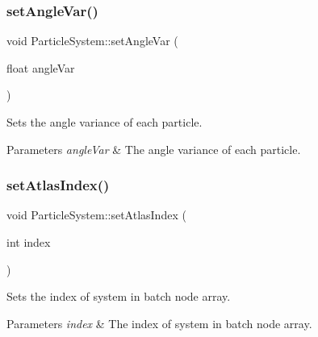 \subsubsection{\texorpdfstring{set\+Angle\+Var()}{setAngleVar()}\hspace{0.1cm}{\footnotesize\ttfamily [2/2]}}
{\footnotesize\ttfamily void Particle\+System\+::set\+Angle\+Var (\begin{DoxyParamCaption}\item[{float}]{angle\+Var }\end{DoxyParamCaption})\hspace{0.3cm}{\ttfamily [inline]}}

Sets the angle variance of each particle.


\begin{DoxyParams}{Parameters}
{\em angle\+Var} & The angle variance of each particle. \\
\hline
\end{DoxyParams}
\mbox{\label{classParticleSystem_ae6e384f788e8bcb76ae4082b0f329cee}} 
\subsubsection{\texorpdfstring{set\+Atlas\+Index()}{setAtlasIndex()}\hspace{0.1cm}{\footnotesize\ttfamily [1/2]}}
{\footnotesize\ttfamily void Particle\+System\+::set\+Atlas\+Index (\begin{DoxyParamCaption}\item[{int}]{index }\end{DoxyParamCaption})\hspace{0.3cm}{\ttfamily [inline]}}

Sets the index of system in batch node array.


\begin{DoxyParams}{Parameters}
{\em index} & The index of system in batch node array. \\
\hline
\end{DoxyParams}
\mbox{\label{classParticleSystem_ae6e384f788e8bcb76ae4082b0f329cee}} 
